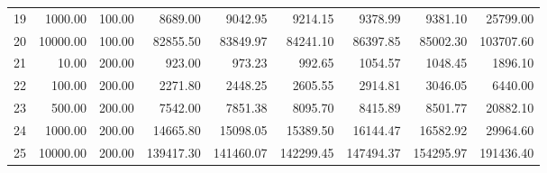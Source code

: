 \begin{table}[ht]
\begin{tabular}{rrrrrrrrr}
  19 & 1000.00 & 100.00 & 8689.00 & 9042.95 & 9214.15 & 9378.99 & 9381.10 & 25799.00 \\ 
  20 & 10000.00 & 100.00 & 82855.50 & 83849.97 & 84241.10 & 86397.85 & 85002.30 & 103707.60 \\ 
  21 & 10.00 & 200.00 & 923.00 & 973.23 & 992.65 & 1054.57 & 1048.45 & 1896.10 \\ 
  22 & 100.00 & 200.00 & 2271.80 & 2448.25 & 2605.55 & 2914.81 & 3046.05 & 6440.00 \\ 
  23 & 500.00 & 200.00 & 7542.00 & 7851.38 & 8095.70 & 8415.89 & 8501.77 & 20882.10 \\ 
  24 & 1000.00 & 200.00 & 14665.80 & 15098.05 & 15389.50 & 16144.47 & 16582.92 & 29964.60 \\ 
  25 & 10000.00 & 200.00 & 139417.30 & 141460.07 & 142299.45 & 147494.37 & 154295.97 & 191436.40 \\ 
   \hline
\end{tabular}
\end{table}
